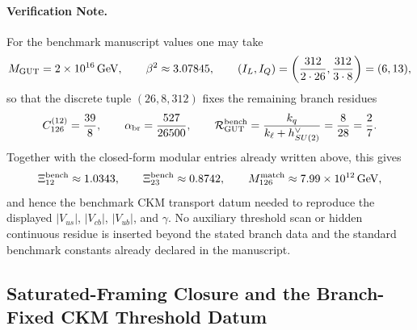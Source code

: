 \documentclass[11pt]{article}
\begin{document}
\paragraph{Verification Note.}
For the benchmark manuscript values one may take
\begin{equation}
 M_{\rm GUT}=2\times10^{16}\,\mathrm{GeV},
 \qquad
 \beta^2\approx 3.07845,
 \qquad
 (I_L,I_Q)=\left(\frac{312}{2\cdot26},\frac{312}{3\cdot8}\right)=(6,13),
\end{equation}
so that the discrete tuple $(26,8,312)$ fixes the remaining branch residues
\begin{equation}
 C_{126}^{(12)}=\frac{39}{8},
 \qquad
 \alpha_{\rm br}=\frac{527}{26500},
 \qquad
 \mathcal R_{\rm GUT}^{\rm bench}=\frac{k_q}{k_{\ell}+h^{\vee}_{SU(2)}}=\frac{8}{28}=\frac{2}{7}.
\end{equation}
Together with the closed-form modular entries already written above, this gives
\begin{equation}
 \Xi_{12}^{\rm bench}\approx1.0343,
 \qquad
 \Xi_{23}^{\rm bench}\approx0.8742,
 \qquad
 M_{126}^{\rm match}\approx7.99\times10^{12}\,\mathrm{GeV},
\end{equation}
and hence the benchmark CKM transport datum needed to reproduce the displayed
$|V_{us}|$, $|V_{cb}|$, $|V_{ub}|$, and $\gamma$. No auxiliary threshold scan
or hidden continuous residue is inserted beyond the stated branch data and the
standard benchmark constants already declared in the manuscript.

\subsection{Saturated-Framing Closure and the Branch-Fixed CKM Threshold Datum}
\end{document}
